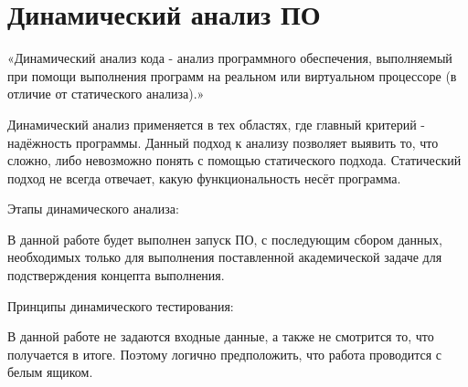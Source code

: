 \section{Динамический анализ ПО}
«Динамический анализ кода - анализ программного обеспечения, выполняемый при помощи выполнения программ на реальном или виртуальном процессоре (в отличие от статического анализа).» \cite{wiki:dinanalise}

Динамический анализ применяется в тех областях,
	где главный критерий - надёжность программы.
Данный подход к анализу позволяет выявить то,
	что сложно, либо невозможно понять с помощью статического подхода.
Статический подход не всегда отвечает,
	какую функциональность несёт программа.

Этапы динамического анализа:


В данной работе будет выполнен запуск ПО,
	с последующим сбором данных,
		необходимых только для выполнения поставленной академической задаче для подстверждения концепта выполнения.

Принципы динамического тестирования:


В данной работе не задаются входные данные,
	а также не смотрится то, что получается в итоге.
Поэтому логично предположить, что работа проводится с белым ящиком.
